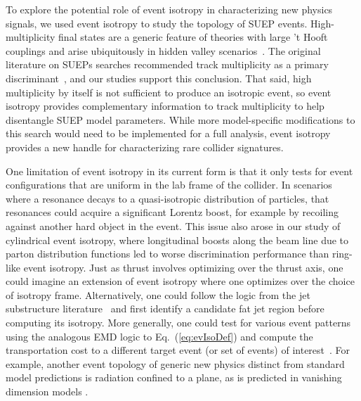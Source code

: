 \documentclass[letterpaper,11pt]{article}
\DeclareRobustCommand{\Eq}[1]{Eq.~(\ref{#1})}
\begin{document}
To explore the potential role of event isotropy in characterizing new physics signals, we used event isotropy to study the topology of SUEP events.
%
High-multiplicity final states are a generic feature of theories with large 't Hooft couplings and arise ubiquitously in hidden valley scenarios~\cite{Strassler:2006im}.
%
The original literature on SUEPs searches recommended track multiplicity as a primary discriminant~\cite{Knapen:2016hky}, and our studies support this conclusion.
%
That said, high multiplicity by itself is not sufficient to produce an isotropic event, so event isotropy provides complementary information to track multiplicity to help disentangle SUEP model parameters. 
%
While more model-specific modifications to this search would need to be implemented for a full analysis, event isotropy provides a new handle for characterizing rare collider signatures.



One limitation of event isotropy in its current form is that it only tests for event configurations that are uniform in the lab frame of the collider.
%
In scenarios where a resonance decays to a quasi-isotropic distribution of particles, that resonances could acquire a significant Lorentz boost, for example by recoiling against another hard object in the event.
%
This issue also arose in our study of cylindrical event isotropy, where longitudinal boosts along the beam line due to parton distribution functions led to worse discrimination performance than ring-like event isotropy.
%
Just as thrust involves optimizing over the thrust axis, one could imagine an extension of event isotropy where one optimizes over the choice of isotropy frame.
%
Alternatively, one could follow the logic from the jet substructure literature~\cite{Larkoski:2017jix,Asquith:2018igt,Marzani:2019hun} and first identify a candidate fat jet region before computing its isotropy.
%
More generally, one could test for various event patterns using the analogous EMD logic to \Eq{eq:evIsoDef} and compute the transportation cost to a different target event (or set of events) of interest~\cite{Komiske:2020qhg}.
%
For example, another event topology of generic new physics distinct from standard model predictions is radiation confined to a plane, as is predicted in vanishing dimension models \cite{Anchordoqui:2010hi,Anchordoqui:2010er}.
\end{document}
